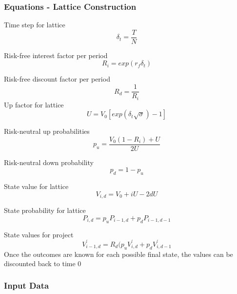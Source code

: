 \subsubsection{Equations - Lattice Construction}

Time step for lattice
\begin{equation}
\delta_t = \frac{T}{N}
\end{equation}

Risk-free interest factor per period
\begin{equation}
R_i = exp( r_f \delta_t )
\end{equation}

Risk-free discount factor per period
\begin{equation}
R_d = \frac{1}{R_i}
\end{equation}
Up factor for lattice
\begin{equation}
U = V_0 \left[	exp( \delta_t \sqrt{ \sigma } ) - 1
	  \right]
\end{equation}

Risk-neutral up probabilities
\begin{equation}
p_u = \frac{   V_0 (1-R_i) + U    }{  2 U          }
\end{equation}

Risk-neutral down probability
\begin{equation}
p_d = 1-p_u
\end{equation}

State value for lattice
\begin{equation}
V_{i,d} = V_0 + iU - 2dU
\end{equation}

State probability for lattice
\begin{equation}
P_{i,d} = p_u P_{i-1,d} + p_d P_{i-1,d-1}
\end{equation}


State values for project
\begin{equation}
V_{i-1,d}^\prime = R_d (p_u V_{i,d}^\prime + p_d V_{i,d-1}^\prime
\end{equation}
Once the outcomes are known for each possible final 
state, the values can be discounted back to time 0

\subsubsection{Input Data}

